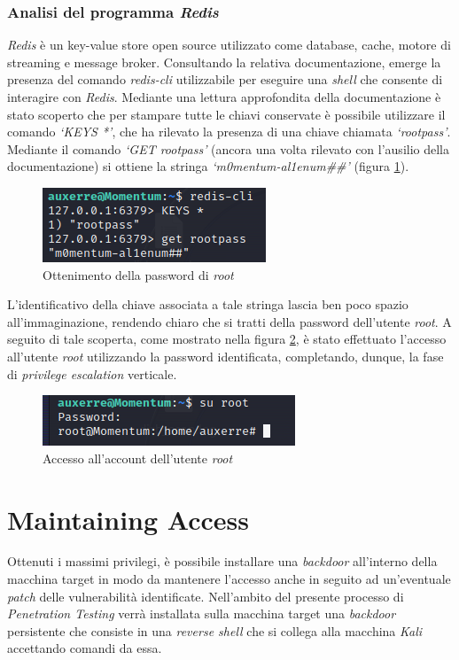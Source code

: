 \subsubsection{Analisi del programma \emph{Redis}}
\emph{Redis} \cite{redis} è un key-value store open source utilizzato come database, cache, motore di streaming e message broker. Consultando la relativa documentazione, emerge la presenza del comando \emph{redis-cli} utilizzabile per eseguire una \emph{shell} che consente di interagire con \emph{Redis}. Mediante una lettura approfondita della documentazione è stato scoperto che per stampare tutte le chiavi conservate è possibile utilizzare il comando \emph{`KEYS *'}, che ha rilevato la presenza di una chiave chiamata \emph{`rootpass'}. Mediante il comando \emph{`GET rootpass'} (ancora una volta rilevato con l'ausilio della documentazione) si ottiene la stringa \emph{`m0mentum-al1enum\#\#'} (figura \ref{fig:rediscli}). 
\begin{figure}[h]
    \centering
    \includegraphics[scale=1]{capitoli/images/rediscli.png}
    \caption{Ottenimento della password di \emph{root}}
    \label{fig:rediscli}
\end{figure}

L'identificativo della chiave associata a tale stringa lascia ben poco spazio all'immaginazione, rendendo chiaro che si tratti della password dell'utente \emph{root}. A seguito di tale scoperta, come mostrato nella figura \ref{fig:root}, è stato effettuato l'accesso all'utente \emph{root} utilizzando la password identificata, completando, dunque, la fase di \emph{privilege escalation} verticale.
\begin{figure}[h]
    \centering
    \includegraphics[scale=1]{capitoli/images/root.png}
    \caption{Accesso all'account dell'utente \emph{root}}
    \label{fig:root}
\end{figure}
\section{Maintaining Access}
Ottenuti i massimi privilegi, è possibile installare una \emph{backdoor} all'interno della macchina target in modo da mantenere l'accesso anche in seguito ad un'eventuale \emph{patch} delle vulnerabilità identificate. Nell'ambito del presente processo di \emph{Penetration Testing} verrà installata sulla macchina target una \emph{backdoor} persistente che consiste in una \emph{reverse shell} che si collega alla macchina \emph{Kali} accettando comandi da essa.
